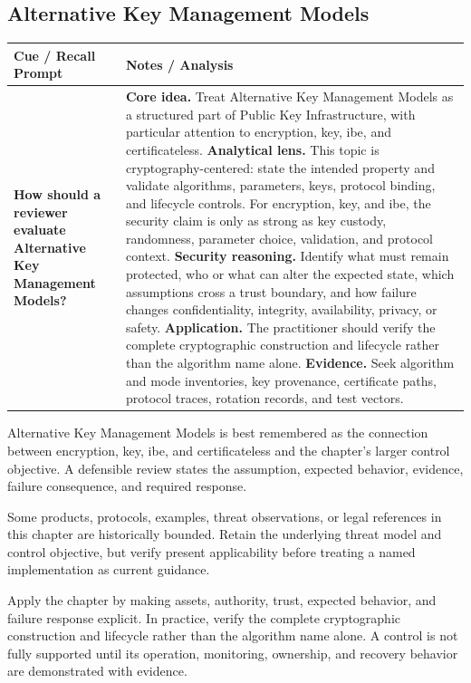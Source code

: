 \documentclass[11pt]{article}
\newcommand{\CornellHeader}{%
\rowcolor{Navy}\color{white}\bfseries Cue / Recall Prompt & \color{white}\bfseries Notes / Analysis\\\hline}
\newcommand{\CornellRow}[2]{%
\cellcolor{CueGray}\RaggedRight\textbf{#1} & \RaggedRight #2\\\hline}
\begin{document}
\subsection*{Alternative Key Management Models}
\begin{longtable}{>{\RaggedRight\arraybackslash}p{}|>{\RaggedRight\arraybackslash}p{}}
\CornellHeader
\CornellRow{How should a reviewer evaluate Alternative Key Management Models?}{\textbf{Core idea.} Treat Alternative Key Management Models as a structured part of Public Key Infrastructure, with particular attention to encryption, key, ibe, and certificateless. \textbf{Analytical lens.} This topic is cryptography-centered: state the intended property and validate algorithms, parameters, keys, protocol binding, and lifecycle controls. For encryption, key, and ibe, the security claim is only as strong as key custody, randomness, parameter choice, validation, and protocol context. \textbf{Security reasoning.} Identify what must remain protected, who or what can alter the expected state, which assumptions cross a trust boundary, and how failure changes confidentiality, integrity, availability, privacy, or safety. \textbf{Application.} The practitioner should verify the complete cryptographic construction and lifecycle rather than the algorithm name alone. \textbf{Evidence.} Seek algorithm and mode inventories, key provenance, certificate paths, protocol traces, rotation records, and test vectors.}
\end{longtable}
\begin{topicsummary}
Alternative Key Management Models is best remembered as the connection between encryption, key, ibe, and certificateless and the chapter's larger control objective. A defensible review states the assumption, expected behavior, evidence, failure consequence, and required response.
\end{topicsummary}
\begin{historybox}
Some products, protocols, examples, threat observations, or legal references in this chapter are historically bounded. Retain the underlying threat model and control objective, but verify present applicability before treating a named implementation as current guidance.
\end{historybox}
\begin{defensebox}
Apply the chapter by making assets, authority, trust, expected behavior, and failure response explicit. In practice, verify the complete cryptographic construction and lifecycle rather than the algorithm name alone. A control is not fully supported until its operation, monitoring, ownership, and recovery behavior are demonstrated with evidence.
\end{defensebox}
\end{document}
